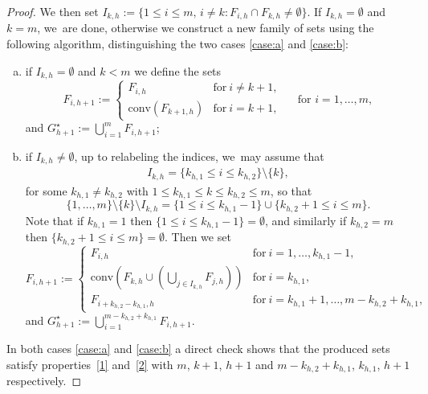 \documentclass[11pt]{article}
\numberwithin{equation}{section}
\theoremstyle{definition}
\begin{document}
\begin{proof}
We then set $I_{k,h}:=\{1\le i\le m,\,i\ne k\colon F_{i,h}\cap F_{k,h}\ne\emptyset\}$.
If $I_{k,h}=\emptyset$ and $k=m$, we~are done, otherwise we
construct a new family of sets using the following algorithm, distinguishing the two cases \ref{case:a} and \ref{case:b}:
\begin{enumerate}[(a),wide]
\item\label{case:a} if $I_{k,h}=\emptyset$ and $k<m$
we define the sets
\begin{equation*}
F_{i,h+1}:=\begin{cases}
F_{i,h}& \text{for}\ i\neq{k+1},\\
\mathrm{conv}(F_{k+1,h})&\text{for}\ i=k+1,
\end{cases}\quad \text{ for }i=1,\dots,m,
\end{equation*}
and $
G_{h+1}^\star:=\bigcup_{i=1}^mF_{i,h+1}$;
\item\label{case:b}
if $I_{k,h}\ne\emptyset$,
up to relabeling the indices, we~may assume that
\begin{align*}
I_{k,h}=\{k_{h,1}\le i\le k_{h,2}\}\setminus\{k\},
\end{align*}
for some $k_{h,1}\ne k_{h,2}$ with $1\leq k_{h,1}\le k\le k_{h,2}\leq m$,
so that
\[
\{1,\dots,m\}\setminus\{k\}\setminus I_{k,h}=\{1\le i\le k_{h,1}-1\}\cup\{k_{h,2}+1\le i\le m\}.
\]
Note that if $k_{h,1}=1$ then $\{1\le i\le k_{h,1}-1\}=\emptyset$, and similarly if $k_{h,2}=m$ then $\{k_{h,2}+1\le i\le m\}=\emptyset$.
Then we set
\begin{equation*}
F_{i,h+1}:= \begin{cases}
F_{i,h}& \text{for}\ i=1,\dots,k_{h,1}-1,\\
\mathrm{conv}(F_{k,h}\cup(\bigcup_{j\in I_{k,h}}F_{j,h}))& \text{for}\ i=k_{h,1},\\
F_{i+k_{h,2}-k_{h,1},h}& \text{for}\ i=k_{h,1}+1,\dots, m-k_{h,2}+k_{h,1},
\end{cases}
\end{equation*}
and $G_{h+1}^\star:=\bigcup_{i=1}^{m-k_{h,2}+k_{h,1}}F_{i,h+1}$.
\end{enumerate}
In both cases \ref{case:a} and \ref{case:b} a direct check shows that the produced sets satisfy properties~\ref{1} and~\ref{2} with $m$, $k+1$, $h+1$ and $m-k_{h,2}+k_{h,1}$, $k_{h,1}$, $h+1$ respectively.


\end{proof}
\end{document}
